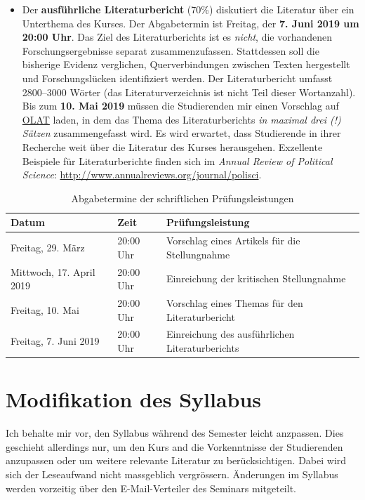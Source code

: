 \documentclass[abstract=on,parskip=full,headings=standardclasses,fontsize=11pt,paper=a4]{scrartcl}
\begin{document}
\begin{itemize}
\item Der \textbf{ausführliche Literaturbericht} (70\%) diskutiert die Literatur über ein Unterthema des Kurses. Der Abgabetermin ist Freitag, der \textbf{7. Juni 2019 um 20:00 Uhr}.  Das Ziel des Literaturberichts ist es \textit{nicht}, die vorhandenen Forschungsergebnisse separat  zusammenzufassen. Stattdessen soll die bisherige Evidenz verglichen,  Querverbindungen zwischen Texten hergestellt und Forschungslücken identifiziert werden. Der Literaturbericht umfasst 2800--3000 Wörter (das Literaturverzeichnis ist  nicht Teil dieser Wortanzahl). Bis zum \textbf{10. Mai 2019} müssen die Studierenden mir einen Vorschlag auf \href{https://lms.uzh.ch/url/RepositoryEntry/16539681116?guest=true&lang=en}{OLAT} laden, in dem das Thema des Literaturberichts \textit{ in maximal drei (!) Sätzen} zusammengefasst wird. Es wird erwartet, dass Studierende in ihrer Recherche weit über die Literatur des Kurses herausgehen. Exzellente Beispiele für Literaturberichte finden sich im \textit{Annual Review of Political Science}: \url{http://www.annualreviews.org/journal/polisci}.


\end{itemize}


\begin{table}[h] \centering \onehalfspacing \small
\caption*{Abgabetermine der schriftlichen Prüfungsleistungen}
\begin{tabular}{ l l l} 
\toprule
Datum &  Zeit & Prüfungsleistung \\
\midrule
Freitag, 29. März  & 20:00 Uhr &   Vorschlag eines Artikels für die Stellungnahme  \\
Mittwoch, 17. April 2019 & 20:00 Uhr & Einreichung der kritischen Stellungnahme  \\
Freitag, 10. Mai  & 20:00 Uhr &  Vorschlag eines Themas für den Literaturbericht \\
Freitag, 7. Juni 2019 & 20:00 Uhr & Einreichung des ausführlichen Literaturberichts  \\
\bottomrule
\end{tabular}
\end{table}

\section*{Modifikation des Syllabus}

Ich behalte mir vor, den Syllabus während des Semester leicht anzpassen. Dies geschieht allerdings nur, um den Kurs and die Vorkenntnisse der Studierenden anzupassen oder um weitere relevante Literatur zu berücksichtigen. Dabei wird sich der Leseaufwand nicht massgeblich vergrössern. Änderungen im Syllabus werden vorzeitig über den E-Mail-Verteiler des Seminars  mitgeteilt. 
\end{document}
